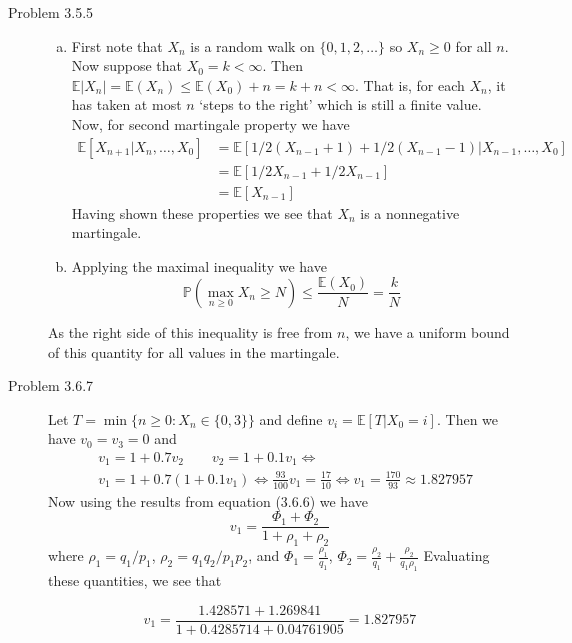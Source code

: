 \documentclass[12pt]{article}  %
\newcommand{\E}{{\mathbb{E}}}
\newcommand{\prob}{{\mathbb{P}}}
\begin{document}
\begin{description}
\item[Problem 3.5.5]
\begin{enumerate}[(a)]
\item First note that $X_n$ is a random walk on $\{0, 1, 2,\ldots\}$ so $X_n\geq 0$ for all $n$. Now suppose that $X_0 = k<\infty$. Then $\E|X_n| = \E(X_n) \leq \E(X_0) + n = k + n <\infty$. That is, for each $X_n$, it has taken at most $n$ `steps to the right' which is still a finite value. Now, for second martingale property we have 
\begin{align*}
\E[X_{n+1}|X_n, \ldots, X_{0}] &= \E[1/2(X_{n-1} + 1) + 1/2(X_{n-1} - 1)|X_{n -1}, \ldots, X_0]\\
&= \E[1/2X_{n-1} + 1/2X_{n-1}]\\
&= \E[X_{n-1}]
\end{align*}
Having shown these properties we see that $X_n$ is a nonnegative martingale.
\item Applying the maximal inequality we have $$\prob(\underset{n\geq 0}{\max}X_n\geq N)\leq \frac{\E(X_0)}{N} = \frac{k}{N}$$ 
\end{enumerate}
As the right side of this inequality is free from $n$, we have a uniform bound of this quantity for all values in the martingale. 

\item[Problem 3.6.7]
Let $T = \min\{n\geq 0: X_n\in\{0,3\}\}$ and define $v_i = \E[T|X_0 = i]$. Then we have $v_0 = v_3 = 0$ and 
\begin{align*}&v_1 = 1 + 0.7v_2 \hspace{2em} v_2 = 1 +0.1v_1 \iff\\ 
&v_1 = 1 + 0.7(1 + 0.1v_1) \iff \frac{93}{100}v_1 = \frac{17}{10} \iff v_1 = \frac{170}{93} \approx 1.827957 
\end{align*}
Now using the results from equation (3.6.6) we have $$v_1 = \frac{\Phi_1 + \Phi_2}{1 + \rho_1 + \rho_2}$$ where $\rho_1 = q_1/p_1$, $\rho_2 = q_1q_2/p_1p_2$, and $\Phi_1 = \frac{\rho_1}{q_1}$, $\Phi_2 = \frac{\rho_2}{q_1} + \frac{\rho_2}{q_1\rho_1}$ Evaluating these quantities, we see that 

$$v_1 = \frac{1.428571 + 1.269841}{1 + 0.4285714 + 0.04761905} = 1.827957$$



\end{description}
\end{document}
